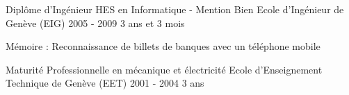 
\begin{cventries}

  \cventry
    {Diplôme d'Ingénieur HES en Informatique - Mention Bien}
    {Ecole d'Ingénieur de Genève (EIG)}
    {2005 - 2009}
    {3 ans et 3 mois}
    {
      \begin{cvitems}
        \item Mémoire : Reconnaissance de billets de banques avec un
          téléphone mobile
      \end{cvitems}
    }

  \cventry
    {Maturité Professionnelle en mécanique et électricité}
    {Ecole d'Enseignement Technique de Genève (EET)}
    {2001 - 2004}
    {3 ans}
    {}

\end{cventries}

